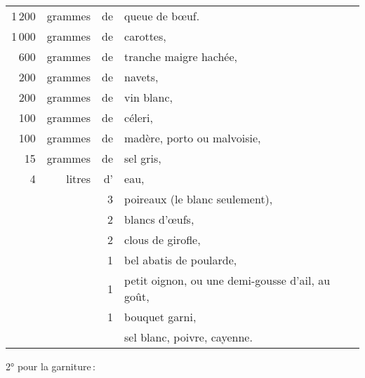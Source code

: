 \footnotesize
\begin{longtable}{rrrp{16em}}
 1 200 & grammes  & de & queue de bœuf.                                                                   \\
 1 000 & grammes  & de & carottes,                                                                        \\
   600 & grammes  & de & tranche maigre hachée,                                                           \\
   200 & grammes  & de & navets,                                                                          \\
   200 & grammes  & de & vin blanc,                                                                       \\
   100 & grammes  & de & céleri,                                                                          \\
   100 & grammes  & de & madère, porto ou malvoisie,                                                      \\
    15 & grammes  & de & sel gris,                                                                        \\
     4 & litres   & d' & eau,                                                                             \\
       &          &  3 & poireaux (le blanc seulement),                                                   \\
       &          &  2 & blancs d'œufs,                                                                   \\
       &          &  2 & clous de girofle,                                                                \\
       &          &  1 & bel abatis de poularde,                                                          \\
       &          &  1 & petit oignon, ou une demi-gousse d'ail, au goût,                                 \\
       &          &  1 & bouquet garni,                                                                   \\
       &          &    & sel blanc, poivre, cayenne.                                                      \\
\end{longtable}
\normalsize    

2° pour la garniture :

